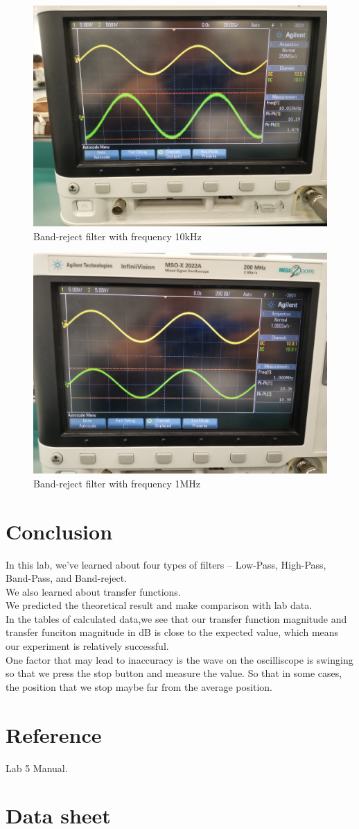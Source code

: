 \documentclass{article}
\begin{document}
  \begin{figure}[H]
  \centering
  \includegraphics[width=.6\textwidth]{Figure13.jpg}
  \caption{Band-reject filter with frequency 10kHz}
  \label{img} 
\end{figure}

  \begin{figure}[H]
  \centering
  \includegraphics[width=.6\textwidth]{Figure14.jpg}
  \caption{Band-reject filter with frequency 1MHz}
  \label{img} 
\end{figure}

\section{Conclusion}
In this lab, we've learned about four types of filters – Low-Pass, High-Pass, Band-Pass, and Band-reject.\\

We also learned about transfer functions.\\

We predicted the theoretical result and make comparison with lab data.\\

In the tables of calculated data,we see that our transfer function magnitude and transfer funciton magnitude in dB is close to the expected value, which means our experiment is relatively successful.\\

One factor that may lead to inaccuracy is the wave on the oscilliscope is swinging so that we press the stop button and measure the value. So that in some cases, the position that we stop maybe far from the average position. 
\section{Reference}

Lab 5 Manual.



\section{Data sheet}
\end{document}
